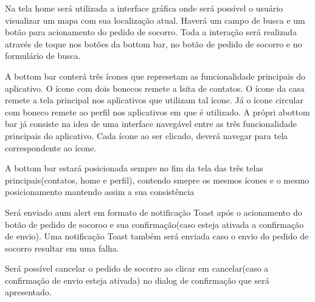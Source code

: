 Na tela home será utilizada a interface gráfica onde será possível o usuário visualizar um mapa com sua localização atual. Haverá um campo de busca e um botão para acionamento do pedido de socorro. Toda a interação será realizada através de toque nos botões da bottom bar, no botão de pedido de socorro e no formulário de busca.

A bottom bar conterá três ícones que represetam as funcionalidade principais do aplicativo. O ícone com dois bonecos remete a lsita de contatos. O ícone da casa remete a tela principal nos aplicativos que utilizam tal ícone. Já o ícone circular com boneco remete ao perfil nos aplicativos em que é utilizado. A própri abottom bar já consiste na idea de uma interface navegável entre as três funcionalidade principais do aplicativo. Cada ícone ao ser clicado, deverá navegar para tela correspondente ao ícone.

A bottom bar estará posicionada sempre no fim da tela das três telas principais(contatos, home e perfil), contendo smepre os mesmos ícones e o mesmo posicionamento mantendo assim a sua consistência

Será enviado aum alert em formato de notificação Toast após o acionamento do botão de pedido de socoroo e sua confirmação(caso esteja ativada a confirmação de envio). Uma notificação Toast também será enviada caso o envio do pedido de socorro resultar em uma falha. 

Será possível cancelar o pedido de socorro ao clicar em cancelar(caso a confirmação de envio esteja ativada) no dialog de confirmação que será apresentado. 

